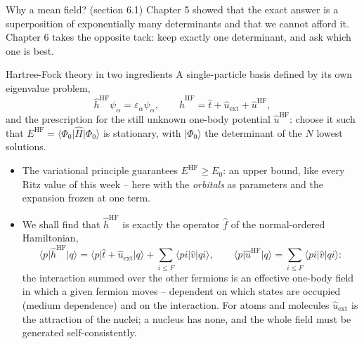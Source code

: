 \documentclass[aspectratio=169,10pt]{beamer}
\newcommand{\ket}[1]{\vert #1\rangle}
\newcommand{\bra}[1]{\langle #1\vert}
\newcommand{\element}[3]{\langle #1\vert #2\vert #3\rangle}
\begin{document}
\begin{frame}{Why a mean field? (section 6.1)}
  \footnotesize
  Chapter 5 showed that the exact answer is a superposition of exponentially many determinants and that we cannot afford it. Chapter 6 takes the opposite tack: \alert{keep exactly one determinant, and ask which one is best}.
  \begin{block}{Hartree-Fock theory in two ingredients}
    A single-particle basis defined by its own eigenvalue problem,
    \[
      \hat{h}^{\mathrm{HF}}\psi_\alpha=\varepsilon_\alpha\psi_\alpha,\qquad
      \hat{h}^{\mathrm{HF}}=\hat{t}+\hat{u}_{\mathrm{ext}}+\hat{u}^{\mathrm{HF}},
    \]
    and the prescription for the still unknown one-body potential $\hat{u}^{\mathrm{HF}}$: choose it such that $E^{\mathrm{HF}}=\bra{\Phi_0}\hat{H}\ket{\Phi_0}$ is stationary, with $\ket{\Phi_0}$ the determinant of the $N$ lowest solutions.
  \end{block}
  \begin{itemize}
    \item The variational principle guarantees $E^{\mathrm{HF}}\ge E_0$: an upper bound, like every Ritz value of this week -- here with the \emph{orbitals} as parameters and the expansion frozen at one term.
    \item We shall find that $\hat{h}^{\mathrm{HF}}$ is exactly the operator $\hat{f}$ of the normal-ordered Hamiltonian,
    \[
      \element{p}{\hat{h}^{\mathrm{HF}}}{q}=\element{p}{\hat{t}+\hat{u}_{\mathrm{ext}}}{q}+\sum_{i\le F}\element{pi}{\hat{v}}{qi},
      \qquad
      \element{p}{\hat{u}^{\mathrm{HF}}}{q}=\sum_{i\le F}\element{pi}{\hat{v}}{qi}:
    \]
    the interaction summed over the other fermions is an effective one-body field in which a given fermion moves -- dependent on which states are occupied (\alert{medium dependence}) and on the interaction. For atoms and molecules $\hat{u}_{\mathrm{ext}}$ is the attraction of the nuclei; a nucleus has none, and the whole field must be generated self-consistently.
  \end{itemize}
\end{frame}
\end{document}
